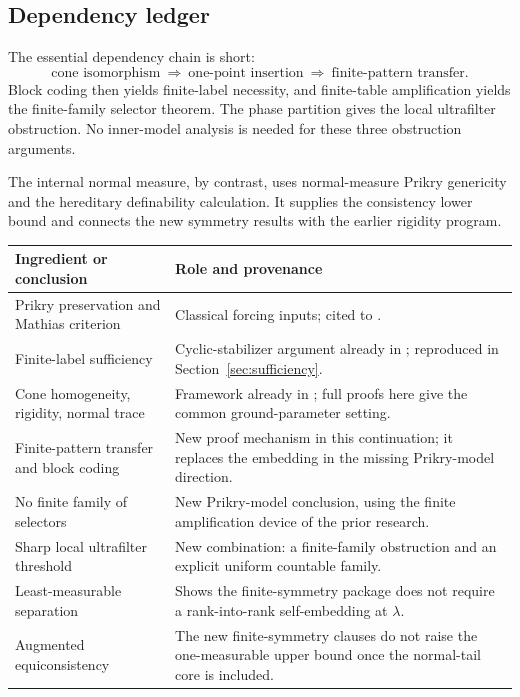 \documentclass[11pt,letterpaper]{article}
\theoremstyle{definition}
\numberwithin{equation}{section}
\begin{document}
\subsection{Dependency ledger}

The essential dependency chain is short:
\[
 \text{cone isomorphism}
 \ \Longrightarrow\ \text{one-point insertion}
 \ \Longrightarrow\ \text{finite-pattern transfer}.
\]
Block coding then yields finite-label necessity, and finite-table amplification yields the finite-family selector theorem. The phase partition gives the local ultrafilter obstruction. No inner-model analysis is needed for these three obstruction arguments.

The internal normal measure, by contrast, uses normal-measure Prikry genericity and the hereditary definability calculation. It supplies the consistency lower bound and connects the new symmetry results with the earlier rigidity program.

\begin{center}
\small
\begin{tabularx}{\textwidth}{@{}p{}Y@{}}
\toprule
\textbf{Ingredient or conclusion}&\textbf{Role and provenance}\\
\midrule
Prikry preservation and Mathias criterion&Classical forcing inputs; cited to \cite{benhamou}.\\
Finite-label sufficiency&Cyclic-stabilizer argument already in \cite{synthesis}; reproduced in Section~\ref{sec:sufficiency}.\\
Cone homogeneity, rigidity, normal trace&Framework already in \cite{synthesis}; full proofs here give the common ground-parameter setting.\\
Finite-pattern transfer and block coding&New proof mechanism in this continuation; it replaces the embedding in the missing Prikry-model direction.\\
No finite family of selectors&New Prikry-model conclusion, using the finite amplification device of the prior research.\\
Sharp local ultrafilter threshold&New combination: a finite-family obstruction and an explicit uniform countable family.\\
Least-measurable separation&Shows the finite-symmetry package does not require a rank-into-rank self-embedding at $\lambda$.\\
Augmented equiconsistency&The new finite-symmetry clauses do not raise the one-measurable upper bound once the normal-tail core is included.\\
\bottomrule
\end{tabularx}
\end{center}
\end{document}
